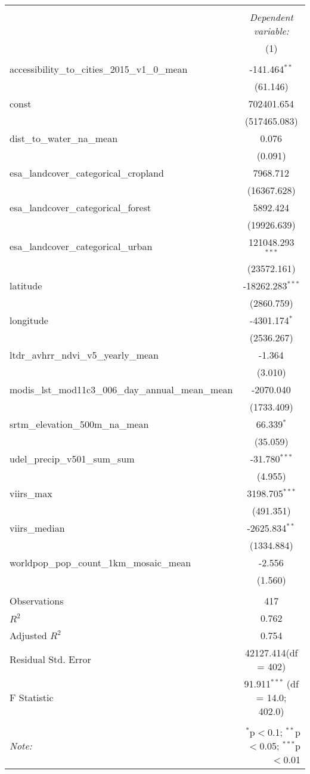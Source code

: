 \begin{table}[!htbp] \centering
\begin{tabular}{@{\extracolsep{5pt}}lc}
\\[-1.8ex]\hline
\hline \\[-1.8ex]
& \multicolumn{1}{c}{\textit{Dependent variable:}} \
\cr \cline{1-2}
\\[-1.8ex] & (1) \\
\hline \\[-1.8ex]
 accessibility_to_cities_2015_v1_0_mean & -141.464$^{**}$ \\
  & (61.146) \\
 const & 702401.654$^{}$ \\
  & (517465.083) \\
 dist_to_water_na_mean & 0.076$^{}$ \\
  & (0.091) \\
 esa_landcover_categorical_cropland & 7968.712$^{}$ \\
  & (16367.628) \\
 esa_landcover_categorical_forest & 5892.424$^{}$ \\
  & (19926.639) \\
 esa_landcover_categorical_urban & 121048.293$^{***}$ \\
  & (23572.161) \\
 latitude & -18262.283$^{***}$ \\
  & (2860.759) \\
 longitude & -4301.174$^{*}$ \\
  & (2536.267) \\
 ltdr_avhrr_ndvi_v5_yearly_mean & -1.364$^{}$ \\
  & (3.010) \\
 modis_lst_mod11c3_006_day_annual_mean_mean & -2070.040$^{}$ \\
  & (1733.409) \\
 srtm_elevation_500m_na_mean & 66.339$^{*}$ \\
  & (35.059) \\
 udel_precip_v501_sum_sum & -31.780$^{***}$ \\
  & (4.955) \\
 viirs_max & 3198.705$^{***}$ \\
  & (491.351) \\
 viirs_median & -2625.834$^{**}$ \\
  & (1334.884) \\
 worldpop_pop_count_1km_mosaic_mean & -2.556$^{}$ \\
  & (1.560) \\
\hline \\[-1.8ex]
 Observations & 417 \\
 $R^2$ & 0.762 \\
 Adjusted $R^2$ & 0.754 \\
 Residual Std. Error & 42127.414(df = 402)  \\
 F Statistic & 91.911$^{***}$ (df = 14.0; 402.0) \\
\hline
\hline \\[-1.8ex]
\textit{Note:} & \multicolumn{1}{r}{$^{*}$p$<$0.1; $^{**}$p$<$0.05; $^{***}$p$<$0.01} \\
\end{tabular}
\end{table}